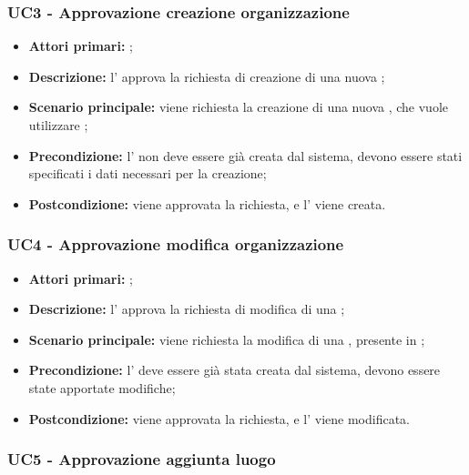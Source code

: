 \documentclass[casi-duso]{subfiles}
\begin{document}
\subsubsection{UC3 - Approvazione creazione organizzazione}
\label{subsub:UC3}

\begin{itemize}
  \item \textbf{Attori primari:} ;
  \item \textbf{Descrizione:} l' approva la richiesta di creazione di una nuova ;
  \item \textbf{Scenario principale:} viene richiesta la creazione di una nuova , che vuole utilizzare ;
  \item \textbf{Precondizione:} l' non deve essere già creata dal sistema, devono essere stati specificati i dati necessari per la creazione;
  \item \textbf{Postcondizione:} viene approvata la richiesta, e l' viene creata.

\end{itemize}
\subsubsection{UC4 - Approvazione modifica organizzazione}
\label{subsub:UC4}

\begin{itemize}
  \item \textbf{Attori primari:} ;
  \item \textbf{Descrizione:} l' approva la richiesta di modifica di una ;
  \item \textbf{Scenario principale:} viene richiesta la modifica di una , presente in ;
  \item \textbf{Precondizione:} l' deve essere già stata creata dal sistema, devono essere state apportate modifiche;
  \item \textbf{Postcondizione:} viene approvata la richiesta, e l' viene modificata.

\end{itemize}
\subsubsection{UC5 - Approvazione aggiunta luogo}
\label{subsub:UC5}
\end{document}
